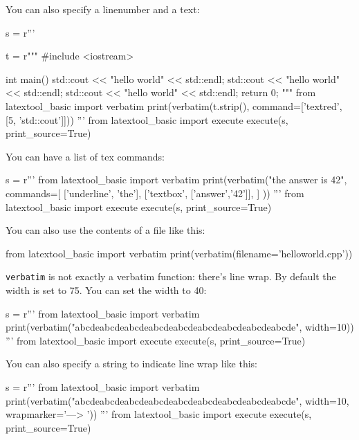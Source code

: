 You can also specify a linenumber and a text:
\begin{python}
s = r'''

t = r"""
#include <iostream>

int main()
{
    std::cout << "hello world" << std::endl;
    std::cout << "hello world" << std::endl;
    std::cout << "hello world" << std::endl;
    return 0;
}
"""
from latextool_basic import verbatim
print(verbatim(t.strip(), command=['textred', [5, 'std::cout']]))
'''
from latextool_basic import execute
execute(s, print_source=True)
\end{python}







\begin{samepage}
You can have a list of tex commands:
\begin{python}
s = r'''
from latextool_basic import verbatim
print(verbatim("the answer is 42", 
               commands=[
                         ['underline', 'the'],
                         ['textbox', ['answer','42']],
                        ]
              ))
'''
from latextool_basic import execute
execute(s, print_source=True)
\end{python}
\end{samepage}


You can also use the contents of a file like this:
\begin{console}
from latextool_basic import verbatim
print(verbatim(filename='helloworld.cpp'))
\end{console}


\newpage
\verb!verbatim! is not exactly a verbatim function:
there's line wrap. 
By default the width is set to 75.
You can set the width to 40:
\begin{python}
s = r'''
from latextool_basic import verbatim
print(verbatim("abcdeabcdeabcdeabcdeabcdeabcdeabcdeabcdeabcde", width=10))
'''
from latextool_basic import execute
execute(s, print_source=True)
\end{python}



You can also specify a string to indicate line wrap like this:
\begin{python}
s = r'''
from latextool_basic import verbatim
print(verbatim("abcdeabcdeabcdeabcdeabcdeabcdeabcdeabcdeabcde", width=10, 
               wrapmarker='---> '))
'''
from latextool_basic import execute
execute(s, print_source=True)
\end{python}



